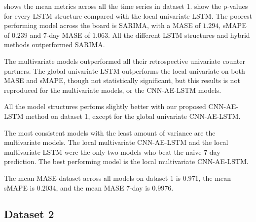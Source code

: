  shows the mean metrics across
all the time series in dataset 1.
 show the p-values
for every LSTM structure compared with the local univariate LSTM.
The poorest performing model across the board
is SARIMA, with a MASE of $1.294$, sMAPE of $0.239$ and 7-day MASE of $1.063$.
All the different LSTM structures and hybrid methods outperformed SARIMA.

The multivariate models outperformed all their retrospective univariate counter partners.
The global univariate LSTM outperforms the local univariate on both MASE and sMAPE, though not statistically significant,
but this results is not reproduced for the multivariate models, or the CNN-AE-LSTM models.

All the model structures perfoms slightly better with our proposed CNN-AE-LSTM method on dataset 1, except for
the global univariate CNN-AE-LSTM.

The most consistent models with the least amount of variance are the multivariate models.
The local multivariate CNN-AE-LSTM and the local multivariate LSTM were the only two models
who beat the naive 7-day prediction. The best performing model is the local multivariate CNN-AE-LSTM.

The mean MASE dataset across all models on dataset 1 is $0.971$,
the mean sMAPE is $0.2034$,
and the mean MASE 7-day is $0.9976$.


\subsection{Dataset 2}

